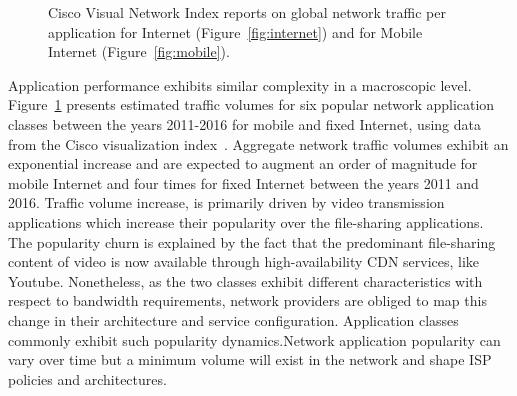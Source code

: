 \begin{figure}[] 
  \caption{Cisco Visual Network Index reports on global network traffic per
    application for Internet (Figure~\ref{fig:internet}) and for Mobile Internet
    (Figure~\ref{fig:mobile}).}
  \label{fig:internet_applications} 
\end{figure}

Application performance exhibits similar complexity in a macroscopic level.
Figure~\ref{fig:internet_applications} presents estimated traffic volumes for
six popular network application classes between the years 2011-2016 for mobile
and fixed Internet, using data from the Cisco visualization
index~\cite{Mobile:2012vd,Cisco:2012wu}. Aggregate network traffic volumes
exhibit an exponential increase and are expected to augment an order of
magnitude for mobile Internet and four times for fixed Internet between the
years 2011 and 2016. Traffic volume increase, is primarily driven by video
transmission applications which increase their popularity over the file-sharing
applications. The popularity churn is explained by the fact that the predominant
file-sharing content of video is now available through high-availability CDN
services, like Youtube. Nonetheless, as the two classes exhibit different
characteristics with respect to  bandwidth requirements, network providers are
obliged to map this change in their architecture and service configuration.
Application classes commonly exhibit such popularity dynamics.Network
application popularity can vary over time but a minimum volume will exist in the
network and shape ISP policies and architectures. 

